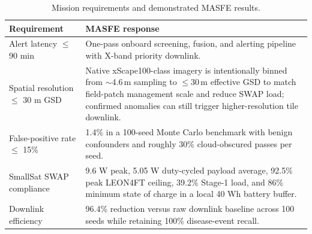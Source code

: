 \documentclass[11pt,letterpaper]{article}
\begin{document}
\begin{table}[H]
\centering
\caption{Mission requirements and demonstrated MASFE results.}
\label{tab:req-results}
\begin{tabularx}{\linewidth}{p{3.2cm}X}
\toprule
\textbf{Requirement} & \textbf{MASFE response} \\
\midrule
Alert latency $\leq$ 90 min & One-pass onboard screening, fusion, and alerting pipeline with X-band priority downlink. \\
Spatial resolution $\leq$ 30 m GSD & Native xScape100-class imagery is intentionally binned from $\sim$4.6\,m sampling to $\leq$30\,m effective GSD to match field-patch management scale and reduce SWAP load; confirmed anomalies can still trigger higher-resolution tile downlink. \\
False-positive rate $\leq$ 15\% & 1.4\% in a 100-seed Monte Carlo benchmark with benign confounders and roughly 30\% cloud-obscured passes per seed. \\
SmallSat SWAP compliance & 9.6 W peak, 5.05 W duty-cycled payload average, 92.5\% peak LEON4FT ceiling, 39.2\% Stage-1 load, and 86\% minimum state of charge in a local 40 Wh battery buffer. \\
Downlink efficiency & 96.4\% reduction versus raw downlink baseline across 100 seeds while retaining 100\% disease-event recall. \\
\bottomrule
\end{tabularx}
\end{table}
\end{document}
